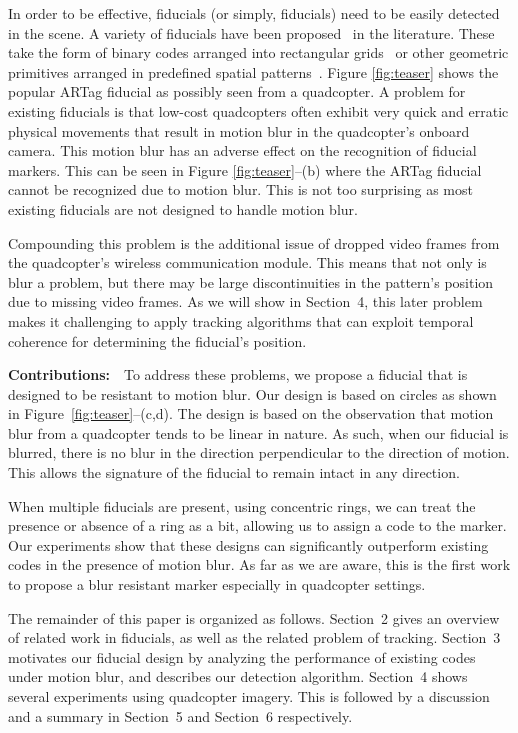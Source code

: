 \documentclass[10pt,twocolumn,letterpaper]{article}
\begin{document}
In order to be effective, fiducials (or simply, fiducials) need
to be easily detected in the scene. A variety of fiducials have
been proposed~\cite{NaimarkF02,ARToolkit02,Fiala05,Pitag13,runetag11}
in the literature.  These take the form of binary codes arranged into
rectangular grids~\cite{ARToolkit02,Fiala05} or other geometric
primitives arranged in predefined spatial
patterns~\cite{NaimarkF02,Pitag13,runetag11}.  Figure \ref{fig:teaser}
shows the popular ARTag \cite{Fiala05} fiducial as possibly seen from
a quadcopter. A problem for existing fiducials is that low-cost
quadcopters often exhibit very quick and erratic physical movements
that result in motion blur in the quadcopter's onboard camera. This
motion blur has an adverse effect on the recognition of fiducial
markers. This can be seen in Figure \ref{fig:teaser}--(b) where the
ARTag fiducial cannot be recognized due to motion blur. This is not
too surprising as most existing fiducials are not designed to handle
motion blur.

Compounding this problem is the additional issue of dropped video
frames from the quadcopter's wireless communication module. This means
that not only is blur a problem, but there may be large
discontinuities in the pattern's position due to missing video
frames. As we will show in Section~4, this later problem makes it
challenging to apply tracking algorithms that can exploit temporal
coherence for determining the fiducial's position.

\noindent\textbf{Contributions:}~~To address these problems, we propose a
fiducial that is designed to be resistant to motion blur. Our design
is based on circles as shown in Figure~\ref{fig:teaser}--(c,d). The
design is based on the observation that motion blur from a quadcopter
tends to be linear in nature. As such, when our fiducial is blurred,
there is no blur in the direction perpendicular to the direction of
motion.  This allows the signature of the fiducial to remain intact in
any direction.

When multiple fiducials are present, using concentric rings, we can
treat the presence or absence of a ring as a bit, allowing us to
assign a code to the marker. Our experiments show that these designs can
significantly outperform existing codes in the presence of motion
blur. As far as we are aware, this is the first work to propose a blur
resistant marker especially in quadcopter settings.

The remainder of this paper is organized as follows.  Section~2 gives
an overview of related work in fiducials, as well as the related
problem of tracking. Section~3 motivates our fiducial design by
analyzing the performance of existing codes under motion blur, and
describes our detection algorithm. Section~4 shows several
experiments using quadcopter imagery. This is followed by a discussion
and a summary in Section~5 and Section~6 respectively.
\end{document}
